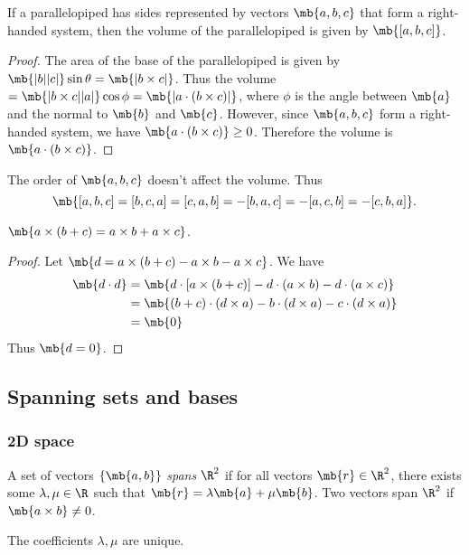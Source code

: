 \documentclass[a4paper]{article}
\begin{document}
\begin{prop}
  If a parallelopiped has sides represented by vectors $\mb{a, b, c}$ that form a right-handed system, then the volume of the parallelopiped is given by $\mb{[a, b, c]}$.
\end{prop}

\begin{proof}
  The area of the base of the parallelopiped is given by $\mb{|b||c|}\sin\theta = \mb{|b\times c|}$. Thus the volume$ = \mb{|b\times c||a|}\cos\phi = \mb{|a\cdot(b\times c)|}$, where $\phi$ is the angle between $\mb{a}$ and the normal to $\mb{b}$ and $\mb{c}$. However, since $\mb{a, b, c}$ form a right-handed system, we have $\mb{a\cdot (b\times c)} \geq 0$. Therefore the volume is $\mb{a\cdot(b\times c)}$.
\end{proof}
\note The order of $\mb{a, b, c}$ doesn't affect the volume. Thus
\[
\mb{[a, b, c] = [b, c, a] = [c, a, b] = -[b, a, c] = -[a, c, b] = -[c, b, a]}.
\]

\begin{thm}
  $\mb{a\times (b + c) = a\times b + a\times c}$.
\end{thm}
\begin{proof}
  Let $\mb{d = a\times (b + c) - a\times b - a\times c}$. We have
  \begin{align*}
    \mb{d\cdot d} &= \mb{d\cdot[a\times (b + c)] - d\cdot(a\times b) - d\cdot(a\times c)}\\
    &= \mb{(b+c)\cdot(d \times a) - b\cdot(d\times a) - c\cdot(d\times a)}\\
    &= \mb{0}
  \end{align*}
  Thus $\mb{d = 0}$.
\end{proof}

\subsection{Spanning sets and bases}
\subsubsection{2D space}
\begin{defi}
  A set of vectors $\{\mb{a, b}\}$ \emph{spans} $\R^2$ if for all vectors $\mb{r}\in \R^2$, there exists some $\lambda, \mu\in \R$ such that $\mb{r} = \lambda\mb{a} + \mu\mb{b}$. Two vectors span $\R^2$ if $\mb{a\times b}\not= 0$.
\end{defi}
\begin{thm}
  The coefficients $\lambda, \mu$ are unique.
\end{thm}
\end{document}

